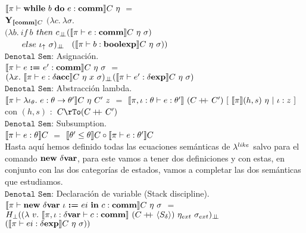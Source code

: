 $\llbracket  \pi \vdash \textbf{while} \ b \ \textbf{do} \ e : \textbf{comm}  \rrbracket C \ \eta$ 
$=$ \\
\indent \indent \indent
$\textbf{Y}_{\llbracket \textbf{comm} \rrbracket C}$ $(\lambda c . \ \lambda \sigma . \ $\\
\indent \indent \indent \indent \indent \indent
$(\lambda b . \ if \ b $ $then \ c_{\bot \!\!\! \bot} (\llbracket \pi \vdash e : \textbf{comm} \rrbracket C \ \eta \ \sigma)$\\
 \indent \indent  \indent \indent \indent \indent \indent \indent \ \ \ \
$else \ \iota_{\uparrow} \ \sigma)_{\bot \!\!\! \bot}$ \
$(\llbracket  \pi \vdash b : \textbf{boolexp} \rrbracket C \ \eta \ \sigma))$\\

\noindent
$\texttt{Denotal Sem:}$ Asignaci\'on.\\

$\llbracket  \pi \vdash e \ \textbf{:=} \ e' : \textbf{comm}  \rrbracket C \ \eta \ \sigma$ 
$=$ \\
\indent \indent \indent \indent \indent 
$(\lambda x . \ \llbracket \pi \vdash e : \delta \textbf{acc} \rrbracket C \ \eta \ x \ \sigma)_{\bot \!\!\! \bot}
(\llbracket  \pi \vdash e' : \delta \textbf{exp}  \rrbracket C \ \eta \ \sigma)$\\

\noindent
$\texttt{Denotal Sem:}$ Abstracci\'on lambda.\\

$\llbracket  \pi \vdash \lambda \iota_{\theta} . \ e : \theta \rightarrow \theta'  \rrbracket C \ \eta \ C' \ z$ 
$=$ 
$\llbracket  \pi,\iota:\theta \vdash e : \theta'  \rrbracket \ (C +\kern-1.3ex+\kern0.8ex C') \
[ \ \llbracket \pi \rrbracket(h,s) \ \eta \ | \ \iota:z \ ]$\\

con $(h,s)$ $:$ $C \rTo (C \concat C')$ \\

\noindent
$\texttt{Denotal Sem:}$ Subsumption.\\

$\llbracket \pi \vdash e : \theta \rrbracket C$ $=$ $\llbracket \theta' \leq \theta \rrbracket C \circ \llbracket \pi \vdash e : \theta' \rrbracket C$\\

Hasta aqu\'i hemos definido todas las ecuaciones sem\'anticas de $\lambda^{like}$ salvo
para el comando $\textbf{new} \ \delta \textbf{var}$, para este vamos a tener dos definiciones
y con estas, en conjunto con las dos categor\'ias de estados, vamos a completar 
las dos sem\'anticas que estudiamos.\\

$\texttt{Denotal Sem:}$ Declaraci\'on de variable (Stack discipline).\\

$\llbracket \pi \vdash \textbf{new} \ \delta \textbf{var} \ \iota \ \textbf{:=} \ ei \ \textbf{in} \ c : \textbf{comm} \rrbracket C \ \eta \ \sigma$ 
$=$ \\ \indent \indent
$H_{\bot} ((\lambda \ v . \ \semBrcks{\pi,\iota:\deltavar \vdash c : \commt}
		\ (C\concat\lrangles{S_\delta}) \ \eta_{ext} \ \sigma_{ext})_{\dbot}$
\\ \indent \indent  \indent  \indent  \indent \indent  \indent
\indent \indent \indent \indent \indent \indent \indent
\indent \indent \indent
$(\llbracket \pi \vdash ei : \delta \textbf{exp} \rrbracket C \ \eta \ \sigma))$\\

